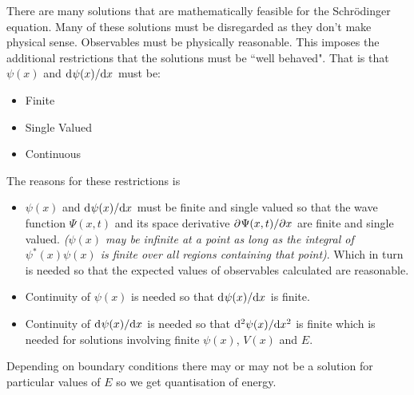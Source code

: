 \documentclass{article}
\begin{document}
    There are many solutions that are mathematically feasible for the Schr\"odinger equation.
    Many of these solutions must be disregarded as they don't make physical sense.
    Observables must be physically reasonable.
    This imposes the additional restrictions that the solutions must be ``well behaved".
    That is that \(\psi(x)\) and \(\inlinedv{\psi(x)}{x}\) must be:
    \begin{itemize}
        \item Finite
        \item Single Valued
        \item Continuous
    \end{itemize}
    The reasons for these restrictions is
    \begin{itemize}
        \item \(\psi(x)\) and \(\inlinedv{\psi(x)}{x}\) must be finite and single valued so that the wave function \(\Psi(x, t)\) and its space derivative \(\inlinepdv{\Psi(x, t)}{x}\) are finite and single valued.
        \textit{(\(\psi(x)\) may be infinite at a point as long as the integral of \(\psi^*(x)\psi(x)\) is finite over all regions containing that point)}.
        Which in turn is needed so that the expected values of observables calculated are reasonable.
        \item Continuity of \(\psi(x)\) is needed so that \(\inlinedv{\psi(x)}{x}\) is finite.
        \item Continuity of \(\inlinedv{\psi(x)}{x}\) is needed so that \(\inlinedv[2]{\psi(x)}{x}\) is finite which is needed for solutions involving finite \(\psi(x)\), \(V(x)\) and \(E\).
    \end{itemize}
    Depending on boundary conditions there may or may not be a solution for particular values of \(E\) so we get quantisation of energy.
    
\end{document}
